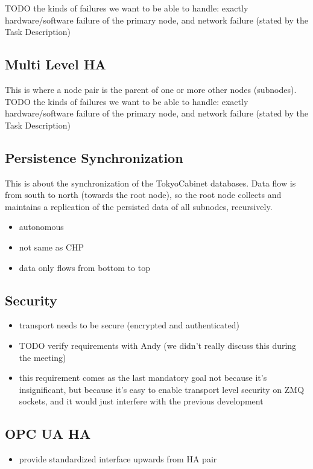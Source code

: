 TODO the kinds of failures we want to be able to handle: exactly hardware/software failure of the primary node, and network failure (stated by the Task Description)\\


\subsection{Multi Level HA}
This is where a node pair is the parent of one or more other nodes (subnodes).\\

TODO the kinds of failures we want to be able to handle: exactly hardware/software failure of the primary node, and network failure (stated by the Task Description)\\

\subsection{Persistence Synchronization}
This is about the synchronization of the TokyoCabinet databases. Data flow is from south to north (towards the root node), so the root node collects and maintains a replication of the persisted data of all subnodes, recursively.

\begin{itemize}
	\item autonomous
	\item not same as CHP
	\item data only flows from bottom to top
\end{itemize}

\subsection{Security}
\begin{itemize}
	\item transport needs to be secure (encrypted and authenticated)
	\item TODO verify requirements with Andy (we didn't really discuss this during the meeting)
	\item this requirement comes as the last mandatory goal not because it's insignificant, but because it's easy to enable transport level security on ZMQ sockets, and it would just interfere with the previous development
\end{itemize}

\subsection{OPC UA HA}
\begin{itemize}
	\item provide standardized interface upwards from HA pair
\end{itemize}

